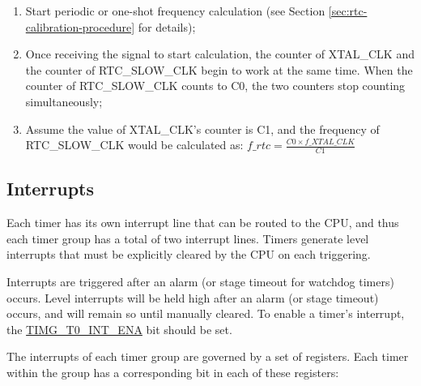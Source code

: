 \documentclass[main\_\_EN.tex]{subfiles}
\begin{document}
\begin{enumerate}
    \item Start periodic or one-shot frequency calculation (see Section \ref{sec:rtc-calibration-procedure} for details);
    \item Once receiving the signal to start calculation, the counter of XTAL\_CLK and the counter of RTC\_SLOW\_CLK begin to work at the same time. When the counter of RTC\_SLOW\_CLK counts to C0, the two counters stop counting simultaneously;
    \item Assume the value of XTAL\_CLK's counter is C1, and the frequency of RTC\_SLOW\_CLK would be calculated as:
    $f\_rtc = \frac{C0 \times f\_XTAL\_CLK}{C1}$
\end{enumerate}
   
\subsection{Interrupts}\label{sec:timg-interrupt}

Each timer has its own interrupt line that can be routed to the CPU, and thus each timer group has a total of two interrupt lines. Timers generate level interrupts that must be explicitly cleared by the CPU on each triggering.

Interrupts are triggered after an alarm (or stage timeout for watchdog timers) occurs. Level interrupts will be held high after an alarm (or stage timeout) occurs, and will remain so until manually cleared. To enable a timer's interrupt, the \hyperref[fielddesc:TIMGT0INTENA]{TIMG\_T0\_INT\_ENA} bit should be set.

The interrupts of each timer group are governed by a set of registers. Each timer within the group has a corresponding bit in each of these registers:
\end{document}

